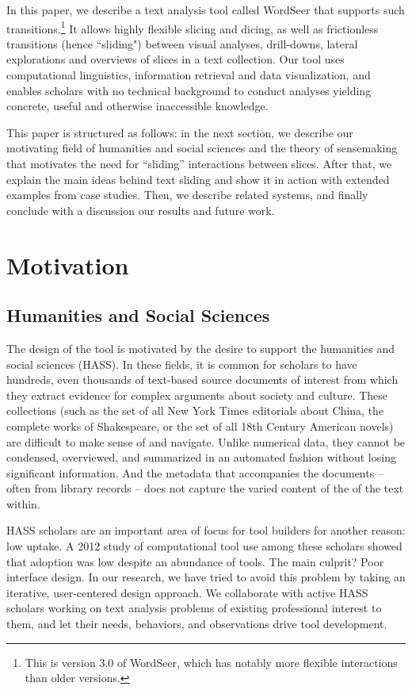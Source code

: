 \documentclass{sig-alternate}
\begin{document}
In this paper, we describe a text analysis tool called WordSeer that supports such transitions.\footnote{This is version 3.0 of WordSeer, which has notably more flexible interactions than older versions.}  It allows highly flexible slicing and dicing, as well as frictionless transitions (hence ``sliding") between visual analyses, drill-downs, lateral explorations and overviews of slices in a text collection. Our tool uses computational linguistics, information retrieval and data visualization, and enables scholars with no technical background to conduct analyses yielding concrete, useful and otherwise inaccessible knowledge. 

This paper is structured as follows: in the next section, we describe our motivating field of humanities and social sciences and the theory of sensemaking that motivates the need for ``sliding'' interactions between slices. After that, we explain the main ideas behind text sliding and show it in action with extended examples from case studies. Then, we describe related systems, and finally conclude with a discussion our results and future work.


\section{Motivation}

\subsection{Humanities and Social Sciences}
The design of the tool is motivated by the desire to support the humanities and social sciences (HASS). In these fields, it is common for scholars to have hundreds, even thousands of text-based source documents of interest from which they extract evidence for complex arguments about society and culture. These collections (such as the set of all New York Times editorials about China, the complete works of Shakespeare, or the set of all 18th Century American novels)  are difficult to make sense of and navigate. Unlike numerical data, they cannot be condensed, overviewed, and summarized in an automated fashion without losing significant information. And the metadata that accompanies the documents -- often from library records -- does not capture the varied content of the of the text within.

HASS scholars are an important area of focus for tool builders for another reason: low uptake. A 2012 study of computational tool use among these scholars showed that adoption was low despite an abundance of tools. The main culprit? Poor interface design. In our research, we have tried to avoid this problem by taking an iterative, user-centered design approach. We collaborate with active HASS scholars working on text analysis problems of existing professional interest to them, and let their needs, behaviors, and observations drive tool development.
\end{document}
